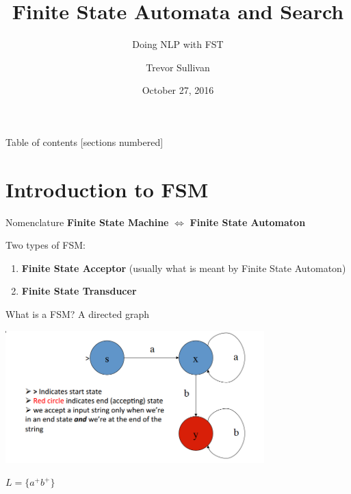 \documentclass[10pt]{beamer}
\title{Finite State Automata and Search}
\subtitle{Doing NLP with FST}
\date{October 27, 2016}
\author{Trevor Sullivan}
\institute{University of Arizona}
\begin{document}
 

\maketitle

\begin{frame}{Table of contents}
  [sections numbered]
  \tableofcontents[hideallsubsections]
\end{frame}

\section{Introduction to FSM}

\begin{frame}[fragile]{Nomenclature}
  \pause
  \textbf{ Finite State Machine } $\iff$ \textbf{ Finite State Automaton }  
  \pause

  Two types of FSM:
  \pause

  \begin{enumerate}[<+->]
    \item 
    \textbf{Finite State Acceptor} (usually what is meant by Finite State Automaton)
    \item
    \textbf{Finite State Transducer}
  \end{enumerate}

\end{frame}

\begin{frame}[fragile]{What is a FSM?}
  \pause
  A directed graph

  \centerline{\includegraphics[width=10cm]{aplusbplus.png}}

  $L = \{a^+b^+\}$


\end{frame}
\end{document}
